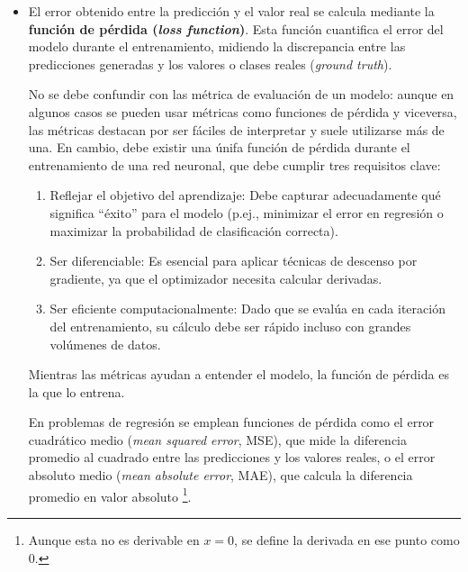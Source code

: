 \begin{itemize}

    \item El error obtenido entre la predicción y el valor real se calcula mediante la \textbf{función de 
    pérdida (\textit{loss function})}. Esta función cuantifica el error del modelo durante el entrenamiento, 
    midiendo la discrepancia entre las predicciones generadas y los valores o clases reales (\textit{ground 
    truth}).

    No se debe confundir con las métrica de evaluación de un modelo: aunque en algunos casos se pueden usar 
    métricas como funciones de pérdida y viceversa, las métricas destacan por ser fáciles de interpretar 
    y suele utilizarse más de una. En cambio, debe existir una únifa función de pérdida durante el 
    entrenamiento de una red neuronal, que debe cumplir tres requisitos clave:

    \begin{enumerate}

        \item Reflejar el objetivo del aprendizaje: Debe capturar adecuadamente qué significa ``éxito'' para 
        el modelo (p.ej., minimizar el error en regresión o maximizar la probabilidad de clasificación 
        correcta).

        \item Ser diferenciable: Es esencial para aplicar técnicas de descenso por gradiente, ya que el 
        optimizador necesita calcular derivadas.

        \item Ser eficiente computacionalmente: Dado que se evalúa en cada iteración del entrenamiento, su 
        cálculo debe ser rápido incluso con grandes volúmenes de datos.

    \end{enumerate}

    Mientras las métricas ayudan a entender el modelo, la función de pérdida es la que lo entrena.

    En problemas de regresión se emplean funciones de pérdida como el error cuadrático medio (\textit{mean 
    squared error}, MSE), que mide la diferencia promedio al cuadrado entre las predicciones y los valores 
    reales, o el error absoluto medio (\textit{mean absolute error}, MAE), que calcula la diferencia promedio 
    en valor absoluto
    \footnote{
        Aunque esta no es derivable en $x=0$, se define la derivada en ese punto como 0.
    }.


\end{itemize}
